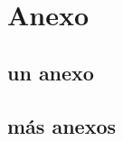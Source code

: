 \documentclass[12pt,a4paper]{article}
\begin{document}


\renewcommand{\thesection}{A\arabic{section}}
\renewcommand{\thesubsection}{A\arabic{subsection}}
\section*{Anexo}

\subsection{un anexo}

\subsection{más anexos}
\end{document}
